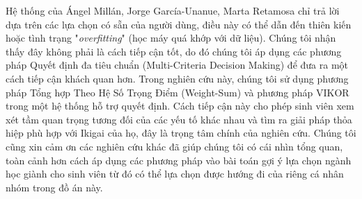 Hệ thống của Ángel Millán, Jorge García-Unanue, Marta Retamosa chỉ trả lời dựa trên các lựa chọn có sẵn của người dùng, điều này có thể dẫn đến thiên kiến hoặc tình trạng "\textit{overfitting}" (học máy quá khớp với dữ liệu). Chúng tôi nhận thấy đây không phải là cách tiếp cận tốt, do đó chúng tôi áp dụng các phương pháp Quyết định đa tiêu chuẩn (Multi-Criteria Decision Making) để đưa ra một cách tiếp cận khách quan hơn. Trong nghiên cứu này, chúng tôi sử dụng phương pháp Tổng hợp Theo Hệ Số Trọng Điểm (Weight-Sum) và phương pháp VIKOR trong một hệ thống hỗ trợ quyết định. Cách tiếp cận này cho phép sinh viên xem xét tầm quan trọng tương đối của các yếu tố khác nhau và tìm ra giải pháp thỏa hiệp phù hợp với Ikigai của họ, đây là trọng tâm chính của nghiên cứu. Chúng tôi cũng xin cảm ơn các nghiên cứu khác đã giúp chúng tôi có cái nhìn tổng quan, toàn cảnh hơn cách áp dụng các phương pháp vào bài toán gợi ý lựa chọn ngành học giành cho sinh viên từ đó có thể lựa chọn được hướng đi của riêng cá nhân nhóm trong đồ án này.
